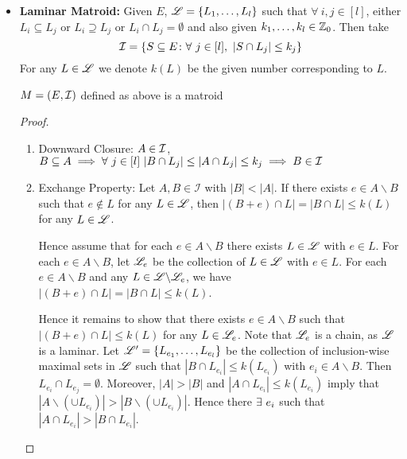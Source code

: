\begin{itemize}[label=$\bullet$]
\begin{proof}
\begin{enumerate}[label=\bfseries\tiny\protect\circled{\small\arabic*}]
	\end{enumerate}Therefore $M$ is a matroid
\end{proof}
\item \textbf{Laminar Matroid:} Given $E$, ${\mathscr{L}}=\{L_1,\dots,L_l\}$ such that $\forall\ i,j\in [l]$, either $L_i\subseteq L_j$ or $L_i\supseteq L_j$ or $L_i\cap L_j=\emptyset$ and also given $k_1,\dots, k_l\in \mathbb{Z}_0$. Then take $$\mathcal{I}=\{S\subseteq E\colon \forall \ j\in[l],\ |S\cap L_j|\leq k_j\}$$For any $L\in{\mathscr{L}}$ we denote $k(L)$ be the given number corresponding to $L$.
\begin{lemma}{}{}
	$M=(E,\mathcal{I})$ defined as above is a matroid
\end{lemma}
\begin{proof}
	\begin{enumerate}[label=\bfseries\tiny\protect\circled{\small\arabic*}]
		\item Downward Closure: $A\in \mathcal{I}$, $B\subseteq A\implies \forall\ j\in[l]\ |B\cap L_j|\leq |A\cap L_j|\leq k_j\implies B\in \mathcal{I}$
		\item Exchange Property: \parinn Let $A,B\in \mathcal{I}$ with $|B|<|A|$.	If there exists $e\in A\backslash B$ such that $e\notin L$ for any $L\in{\mathscr{L}}$, then $|(B+e)\cap L|=|B\cap L|\leq k(L)$ for any $L\in{\mathscr{L}}$.
		
		Hence assume that for each $e\in A\backslash B$ there exists $L\in{\mathscr{L}}$ with $e\in L$.
		For each $e\in A\backslash B$, let ${\mathscr{L}}_e$ be the collection of $L\in{\mathscr{L}}$ with $e\in L$.
		For each $e\in A\backslash B$ and any $L\in{\mathscr{L}}\backslash{\mathscr{L}}_e$, we have $|(B+e)\cap L|=|B\cap L|\leq k(L)$.
		
		Hence it remains to show that there exists $e\in A\backslash B$ such that $|(B+e)\cap L|\leq k(L)$ for any $L\in{\mathscr{L}}_e$.
		Note that ${\mathscr{L}}_e$ is a chain, as ${\mathscr{L}}$ is a laminar.
		Let ${\mathscr{L}}'=\{L_{e_1},\ldots,L_{e_l}\}$ be the collection of inclusion-wise maximal sets in ${\mathscr{L}}$ such that $|B\cap L_{e_i}|\leq k(L_{e_i})$ with $e_i\in A\backslash B$.
		Then $L_{e_i}\cap L_{e_j}=\emptyset$. Moreover, $|A|>|B|$ and $|A\cap L_{e_i}|\leq k(L_{e_i})$ imply that $|A\backslash (\cup L_{e_i})|>|B\backslash (\cup L_{e_i})|$. Hence there $\exists\ e_i$ such that $|A\cap L_{e_i}|>|B\cap L_{e_i}|$.
		

\end{enumerate}
\end{proof}
\end{itemize}
